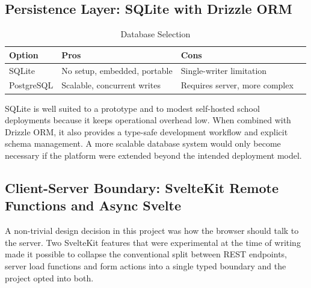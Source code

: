 \subsection{Persistence Layer: SQLite with Drizzle ORM}
\begin{table}[h]
  \centering
  \label{tab:database-selection}
  \caption{Database Selection}
  \begin{tabularx}{0.9\textwidth}{|l|X|X|l|}
    \hline
    \textbf{Option}     & \textbf{Pros}                         & \textbf{Cons}                          \\\hline
    SQLite     & No setup, embedded, portable & Single-writer limitation      \\\hline
    PostgreSQL & Scalable, concurrent writes  & Requires server, more complex \\\hline
  \end{tabularx}
\end{table}

SQLite is well suited to a prototype and to modest self-hosted school deployments because it keeps operational overhead low.
When combined with Drizzle ORM, it also provides a type-safe development workflow and explicit schema management.
A more scalable database system would only become necessary if the platform were extended beyond the intended deployment model.

\subsection{Client-Server Boundary: SvelteKit Remote Functions and Async Svelte}
A non-trivial design decision in this project was how the browser should talk to the server.
Two SvelteKit features that were experimental at the time of writing made it possible to collapse
the conventional split between REST endpoints, server load functions and form actions into a single
typed boundary and the project opted into both.

